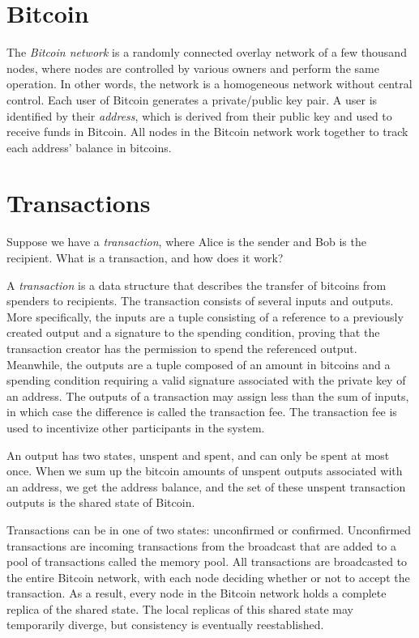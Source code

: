 \documentclass{article}
\begin{document}
\section{Bitcoin}

The \emph{Bitcoin network} is a randomly connected overlay network of a few
thousand nodes, where nodes are controlled by various owners and perform the
same operation. In other words, the network is a homogeneous network without
central control. Each user of Bitcoin generates a private/public key pair. A
user is identified by their \emph{address}, which is derived from their public
key and used to receive funds in Bitcoin. All nodes in the Bitcoin network work
together to track each address' balance in bitcoins.

\section{Transactions}

Suppose we have a \emph{transaction}, where Alice is the sender and Bob is the
recipient. What is a transaction, and how does it work?

A \emph{transaction} is a data structure that describes the transfer of bitcoins
from spenders to recipients. The transaction consists of several inputs and
outputs. More specifically, the inputs are a tuple consisting of a reference to
a previously created output and a signature to the spending condition, proving
that the transaction creator has the permission to spend the referenced output.
Meanwhile, the outputs are a tuple composed of an amount in bitcoins and a
spending condition requiring a valid signature associated with the private key
of an address. The outputs of a transaction may assign less than the sum of
inputs, in which case the difference is called the transaction fee. The
transaction fee is used to incentivize other participants in the system.

An output has two states, unspent and spent, and can only be spent at most once.
When we sum up the bitcoin amounts of unspent outputs associated with an
address, we get the address balance, and the set of these unspent transaction
outputs is the shared state of Bitcoin.

Transactions can be in one of two states: unconfirmed or confirmed. Unconfirmed
transactions are incoming transactions from the broadcast that are added to a
pool of transactions called the memory pool. All transactions are broadcasted to
the entire Bitcoin network, with each node deciding whether or not to accept the
transaction. As a result, every node in the Bitcoin network holds a complete
replica of the shared state. The local replicas of this shared state may
temporarily diverge, but consistency is eventually reestablished.
\end{document}
